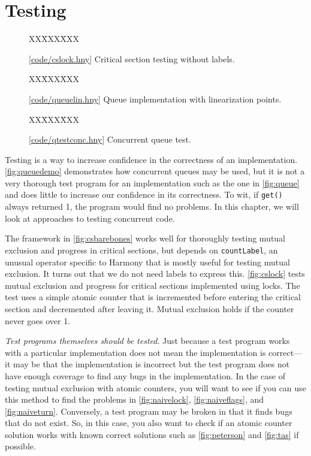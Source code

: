 \documentclass{report}
\newcommand{\harmonysource}[1]{
\begin{tabbing}
XX\=XXX\=XXX\kill
    
\end{tabbing}
}
\newcommand{\harmonylink}[1]{%
[\href{https://harmony.cs.cornell.edu/#1}{\underline{#1}}]%
}
\newenvironment{code}{
\tcolorbox
}{
\endtcolorbox
}
\begin{document}
\chapter{Testing}
\label{ch:testing}

\begin{figure}
\begin{code}
\harmonysource{cslock}
\end{code}
\caption{\harmonylink{code/cslock.hny} Critical section testing without labels.}
\label{fig:cslock}
\end{figure}

\begin{figure}
\begin{code}
\harmonysource{queuelin}
\end{code}
\caption{\harmonylink{code/queuelin.hny} Queue implementation with linearization points.}
\label{fig:queuelin}
\end{figure}

\begin{figure}
\begin{code}
\harmonysource{qtestconc}
\end{code}
\caption{\harmonylink{code/qtestconc.hny} Concurrent queue test.}
\label{fig:qtestconc}
\end{figure}

Testing is a way to increase confidence in the correctness
of an implementation.
\autoref{fig:queuedemo} demonstrates how concurrent queues
may be used, but it is not a very thorough test program
for an implementation such as the one in \autoref{fig:queue}
and does little to increase our confidence in its correctness.
To wit, if \texttt{get()} always returned 1, the program
would find no problems.
In this chapter, we will look at approaches to testing
concurrent code.

The framework in \autoref{fig:csbarebones} works well for thoroughly
testing mutual exclusion and progress in critical sections, but depends
on \texttt{countLabel}, an unusual operator specific to Harmony that is mostly
useful for testing mutual exclusion.
It turns out that we do not need labels to express this.
\autoref{fig:cslock} tests mutual exclusion and progress for
critical sections implemented using locks.
The test uses a simple atomic counter that is incremented before entering
the critical section and decremented after leaving it.
Mutual exclusion holds if the counter never goes over 1.

\emph{Test programs themselves should be tested}.
Just because a test program works with a particular implementation
does not mean the implementation is correct---it may be that the implementation
is incorrect but the test program does not have enough coverage to find any
bugs in the implementation.
In the case of testing mutual exclusion with atomic counters, you will want
to see if you can use this method to find the problems in \autoref{fig:naivelock},
\autoref{fig:naiveflags},
and \autoref{fig:naiveturn}.
Conversely, a test program may be broken in that it finds bugs that do not exist.
So, in this case,
you also want to check if an atomic counter solution works with known
correct solutions such as \autoref{fig:peterson} and \autoref{fig:tas}
if possible.
\end{document}

